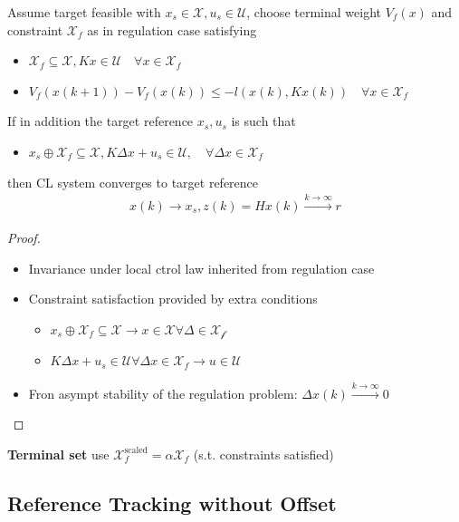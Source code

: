 Assume target feasible with $x_s \in \mathcal{X}, u_s \in \mathcal{U}$,
choose terminal weight $V_f(x)$ and constraint $\mathcal{X}_f$ as in regulation case satisfying
\begin{itemize}[leftmargin=1em]
	\item $\mathcal{X}_f \subseteq \mathcal{X}, K x \in \mathcal{U} \quad \forall x \in \mathcal{X}_f$
	\item $V_f(x(k+1)) - V_f(x(k)) \leq -l (x(k), Kx(k)) \quad \forall x \in \mathcal{X}_f$
\end{itemize}
If in addition the target reference $x_s, u_s$ is such that
\begin{itemize}[leftmargin=1em]
	\item $x_s \oplus \mathcal{X}_f \subseteq \mathcal{X}, K\Delta x + u_s \in \mathcal{U}, \quad \forall \Delta x \in \mathcal{X}_f$
\end{itemize}
then CL system converges to target reference
\begin{align*}
	x(k) \to x_s, z(k) = Hx(k) \xrightarrow{k\to\infty}r
\end{align*}

\begin{proof}

	\begin{itemize}[leftmargin = 1em]
		\item Invariance under local ctrol law inherited from regulation case
		\item Constraint satisfaction provided by extra conditions
		      \begin{itemize}
			      \item $x_s \oplus \mathcal{X}_f \subseteq \mathcal{X} \to x\in \mathcal{X} \forall \Delta \in\mathcal{X_f}$
			      \item $K\Delta x + u_s \in \mathcal{U} \forall \Delta x \in \mathcal{X}_f \to u\in\mathcal{U}$
		      \end{itemize}
		\item Fron asympt stability of the regulation problem: $\Delta x (k) \xrightarrow{k\to\infty}0$
	\end{itemize}
\end{proof}

\textbf{Terminal set} use
$\mathcal{X}_f^{\text{scaled}} = \alpha \mathcal{X}_f$
(s.t. constraints satisfied)

\subsection{Reference Tracking without Offset}

